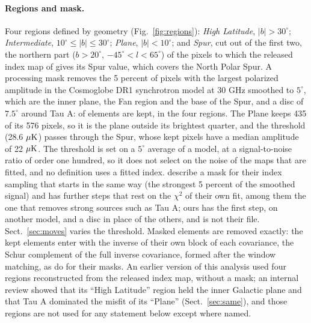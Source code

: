 \paragraph{Regions and mask.} Four regions defined by geometry (Fig.~\ref{fig:regions}): \emph{High
Latitude}, $|b| > 30^\circ$; \emph{Intermediate}, $10^\circ \le |b| \le 30^\circ$; \emph{Plane},
$|b| < 10^\circ$; and \emph{Spur}, cut out of the first two, the northern part ($b > 20^\circ$,
$-45^\circ < l < 65^\circ$) of the pixels to which the released index map of \citet{svalheim2023}
gives its Spur value, which covers the North Polar Spur. A processing mask removes the 5 percent of
pixels with the largest polarized amplitude in the Cosmoglobe DR1 synchrotron model at 30 GHz smoothed
to $5^\circ$, which are the inner plane, the Fan region and the base of the Spur, and a disc of
$7.5^\circ$ around Tau A:  of  elements are kept,  in the four regions.
The Plane keeps 435 of its 576 pixels, so it is the plane outside its brightest quarter, and the
threshold (28.6 $\mu\mathrm{K}$) passes through the Spur, whose kept pixels have a median amplitude of 22
$\mu\mathrm{K}$. The threshold is set on a $5^\circ$ average of a model, at a signal-to-noise ratio of order
one hundred, so it does not select on the noise of the maps that are fitted, and no definition uses a
fitted index. \citet{svalheim2023} describe a mask for their index sampling that starts in the same
way (the strongest 5 percent of the smoothed signal) and has further steps that rest on the $\chi^2$
of their own fit, among them the one that removes strong sources such as Tau A; ours has the first
step, on another model, and a disc in place of the others, and is not their file. Sect.~\ref{sec:moves}
varies the threshold. Masked elements are removed exactly: the kept elements enter with the inverse
of their own block of each covariance, the Schur complement of the full inverse covariance, formed
after the window matching, as \citet{jarosik2011} do for their masks. An earlier version of this
analysis used four regions reconstructed from the released index map, without a mask; an internal
review showed that its ``High Latitude'' region held the inner Galactic plane and that Tau A
dominated the misfit of its ``Plane'' (Sect.~\ref{sec:same}), and those regions are not used for any
statement below except where named.

